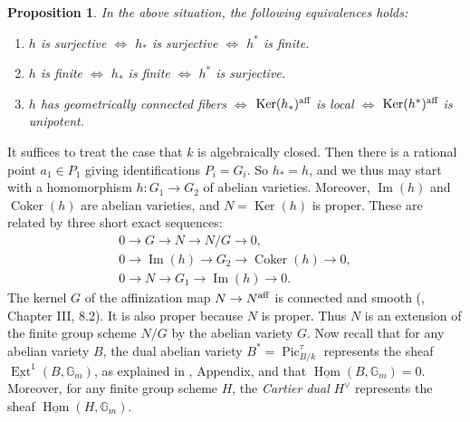 \documentclass[oneside, 12pt]{amsart}
\newcommand\mylabel[1]{\label{#1}\marginpar{\vspace{-1ex}\medskip\medskip\footnotesize \tt #1}}
\renewcommand\mylabel[1]{\label{#1}}
\newtheorem{proposition}[theorem]{Proposition}
\theoremstyle{definition}
\theoremstyle{remark}
\newcommand{\GG}{\mathbb{G}}
\newcommand{\aff}{\text{\rm aff}}
\newcommand{\Cokernel}{\operatorname{Coker}}
\newcommand{\Image}{\operatorname{Im}}
\newcommand{\Kernel}{\operatorname{Ker}}
\newcommand{\lra}{\longrightarrow}
\newcommand{\Pic}{\operatorname{Pic}}
\newcommand{\ra}{\rightarrow}
\newcommand{\uHom}{\underline{\operatorname{Hom}}}
\newcommand{\uExt}{\underline{\operatorname{Ext}}}
\begin{document}
\begin{proposition}
\mylabel{equivalences abelian varieties}
In the above situation, the following equivalences holds: 
\begin{enumerate}
\item $h$ is surjective $\Leftrightarrow$ $h_*$ is surjective $\Leftrightarrow$ $h^*$ is finite.
\item $h$ is finite $\Leftrightarrow$ $h_*$ is finite $\Leftrightarrow$ $h^*$ is surjective.
\item $h$ has geometrically connected fibers $\Leftrightarrow$  $\Kernel(h_*)^\aff$ is local $\Leftrightarrow$ $\Kernel(h^*)^\aff$ is unipotent.
\end{enumerate}
\end{proposition}

\proof
It suffices to treat the case that $k$ is algebraically closed. Then there is a rational point $a_1\in P_1$
giving   identifications $P_i=G_i$. So $h_*=h$, and we  thus may start with a homomorphism $h:G_1\ra G_2$ of abelian varieties.
Moreover,  $\Image(h)$ and $\Cokernel(h)$ are abelian varieties,
and   $N=\Kernel(h)$ is proper. 
These are related by  three short exact sequences:
\begin{gather*}
0\lra G\lra N\lra N/G\lra 0,\\
0\lra \Image(h)\lra G_2\lra \Cokernel(h)\lra 0,\\
0\lra N\lra G_1\lra \Image(h)\lra 0.
\end{gather*}
The kernel $G$ of the affinization map $N\ra N^\aff$ is connected and smooth 
(\cite{Demazure; Gabriel 1970}, Chapter III, 8.2). It is also proper because $N$ is proper.
Thus $N$ is an extension of the finite group scheme $N/G$ by the abelian variety
$G$.  
Now recall that for any abelian variety $B$, the  dual abelian variety  $B^*=\Pic^\tau_{B/k}$ represents the sheaf
$\uExt^1(B,\GG_m)$, as explained in \cite{Moret-Bailly 1981}, Appendix, and that $\uHom(B,\GG_m)=0$.
Moreover,  for any finite group scheme $H$, the \emph{Cartier dual} $H^\vee$ represents the sheaf $\uHom(H,\GG_m)$.
\end{document}
